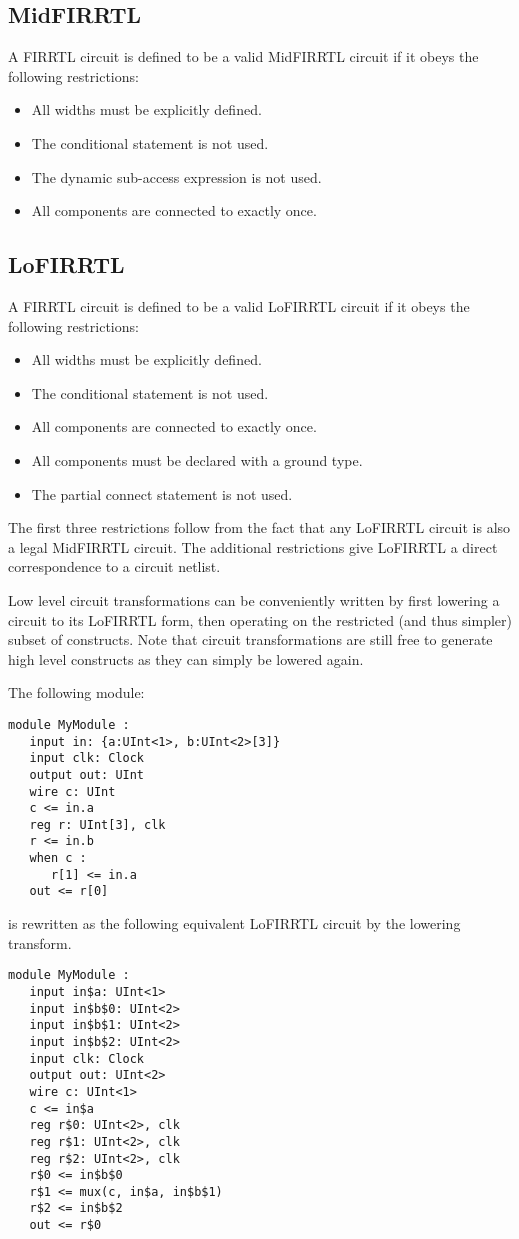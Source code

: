 \documentclass[12pt]{article}
\begin{document}
\subsection{MidFIRRTL}

A FIRRTL circuit is defined to be a valid MidFIRRTL circuit if it obeys the following restrictions:
\begin{itemize}
\item All widths must be explicitly defined.
\item The conditional statement is not used.
\item The dynamic sub-access expression is not used.
\item All components are connected to exactly once.
\end{itemize}

\subsection{LoFIRRTL}

A FIRRTL circuit is defined to be a valid LoFIRRTL circuit if it obeys the following restrictions:
\begin{itemize}
\item All widths must be explicitly defined.
\item The conditional statement is not used.
\item All components are connected to exactly once.
\item All components must be declared with a ground type.
\item The partial connect statement is not used.
\end{itemize}

The first three restrictions follow from the fact that any LoFIRRTL circuit is also a legal MidFIRRTL circuit. The additional restrictions give LoFIRRTL a direct correspondence to a circuit netlist.

Low level circuit transformations can be conveniently written by first lowering a circuit to its LoFIRRTL form, then operating on the restricted (and thus simpler) subset of constructs. Note that circuit transformations are still free to generate high level constructs as they can simply be lowered again.

The following module:
\begin{lstlisting}
module MyModule :
   input in: {a:UInt<1>, b:UInt<2>[3]}
   input clk: Clock
   output out: UInt
   wire c: UInt
   c <= in.a
   reg r: UInt[3], clk
   r <= in.b
   when c :
      r[1] <= in.a
   out <= r[0]
\end{lstlisting}
is rewritten as the following equivalent LoFIRRTL circuit by the lowering transform.
\begin{lstlisting}
module MyModule :
   input in$a: UInt<1>
   input in$b$0: UInt<2>
   input in$b$1: UInt<2>
   input in$b$2: UInt<2>
   input clk: Clock
   output out: UInt<2>
   wire c: UInt<1>
   c <= in$a
   reg r$0: UInt<2>, clk
   reg r$1: UInt<2>, clk
   reg r$2: UInt<2>, clk
   r$0 <= in$b$0
   r$1 <= mux(c, in$a, in$b$1)
   r$2 <= in$b$2
   out <= r$0
\end{lstlisting}
\end{document}
